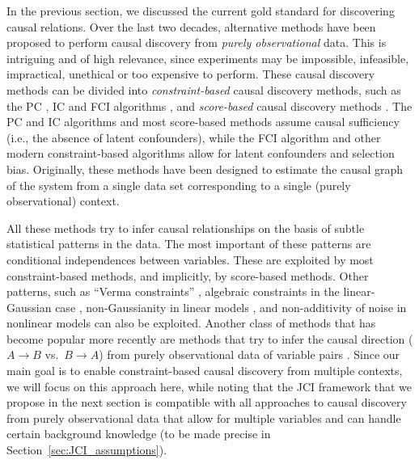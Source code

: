 \documentclass[twoside,11pt]{article}
\begin{document}
In the previous section, we discussed the current gold standard for discovering causal relations.
Over the last two decades, alternative methods have been proposed to perform causal discovery
from \emph{purely observational} data. This is intriguing and of high relevance, 
since experiments may be impossible, infeasible, impractical, unethical or too expensive to perform. 
These causal discovery methods can be divided into \emph{constraint-based} causal discovery methods, 
such as the PC \citep{SGS2000}, IC \citep{Pearl2009} and FCI algorithms 
\citep{SMR1999,Zhang2008_AI}, 
and \emph{score-based} causal discovery methods \citep[e.g.,][]{HGC1995,Chickering2002,KoivistoSood2004}.
The PC and IC algorithms and most score-based methods assume causal sufficiency (i.e., the absence of latent confounders), while
the FCI algorithm and other modern constraint-based algorithms allow for latent confounders and selection bias.
Originally, these methods have been designed to estimate the causal graph of the system 
from a single data set corresponding to a single (purely observational) context.

All these methods try to infer causal relationships on the basis of subtle statistical patterns
in the data. The most important of these patterns are conditional independences between variables.
These are exploited by most constraint-based methods, and implicitly, by score-based methods.
Other patterns, such as ``Verma constraints'' \citep{Shpitser++2014}, algebraic constraints
in the linear-Gaussian case \citep{VanOmmenMooij_UAI_17}, non-Gaussianity in 
linear models \citep{KanoShimizu2003}, and non-additivity of noise in nonlinear models
\citep{PetersMooijJanzingSchoelkopf_JMLR_14} can also be exploited. Another class of methods that has 
become popular more recently are methods that try to infer the causal direction ($A \to B$ 
vs.\ $B \to A$) from purely observational data of variable pairs \citep[see e.g.,][]{Mooij++_JMLR_16}.
Since our main goal is to enable constraint-based causal discovery from multiple contexts, we
will focus on this approach here, while noting that the JCI framework that we propose in the next
section is compatible with all approaches to causal discovery from purely observational data
that allow for multiple variables and can handle certain background knowledge (to be made
precise in Section~\ref{sec:JCI_assumptions}).
\end{document}
